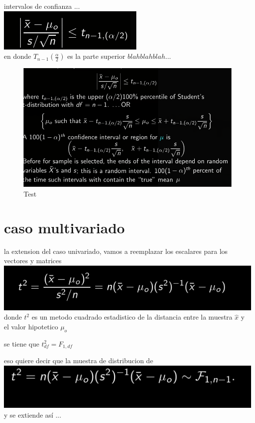 \documentclass[10pt,a4paper]{article} %
\begin{document}
        \newpage
        intervalos de confianza ...
        \\
        \includegraphics[width=0.8\linewidth]{conf.png}
        \\
        en donde $ T_{n-1}( \frac{\alpha }{2} )  $  es la parte superior $ blah
        blah blah...  $
        \begin{figure}[h!]
            \centering
            \includegraphics[width=0.8\linewidth]{test.png}
            \caption{Test}
            \label{fig}
        \end{figure}

    \section{caso multivariado}
        la extension del caso univariado, vamos a reemplazar los escalares para los vectores y matrices
        \\
        \includegraphics[width=0.8\linewidth]{t2.png}
        \\
        donde $ t ^{2}    $ es un metodo cuadrado estadistico de la distancia
        entre la muestra $ \hat{x}   $  y el valor hipotetico $ \mu _o  $

        se tiene que $ t_{df} ^{2}  = F_{1,df}  $


        eso quiere decir que la muestra de distribucion de
        \\
        \includegraphics[width=0.8\linewidth]{tsample}
        \\
        y se extiende así ...
\end{document}
